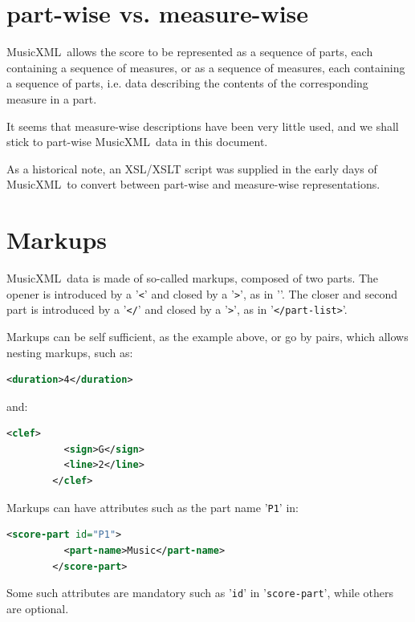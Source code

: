 \documentclass[12pt,a4paper]{article}
\newcommand{\mxml}{MusicXML}
\begin{document}
\section{part-wise vs. measure-wise}

\mxml\ allows the score to be represented as a sequence of parts, each containing a sequence of measures, or as a sequence of measures, each containing a sequence of parts, i.e. data describing the contents of the corresponding measure in a part.
 
It seems that measure-wise descriptions have been very little used, and we shall stick to part-wise \mxml\ data in this document.

As a historical note, an XSL/XSLT script was supplied in the early days of \mxml\ to convert between part-wise and measure-wise representations.

\section{Markups}

\mxml\ data is made of so-called markups, composed of two parts. The opener is introduced by a '{\tt <}' and closed by a '{\tt >}', as in '{\tt <part-list>}'. The closer and second part is introduced by a '{\tt </}' and closed by a '{\tt >}', as in '{\tt </part-list>}'.

Markups can be self sufficient, as the example above, or go by pairs, which allows nesting markups, such as:
\begin{lstlisting}[language=XML]
        <duration>4</duration>
\end{lstlisting}
and:
\begin{lstlisting}[language=XML]
        <clef>
          <sign>G</sign>
          <line>2</line>
        </clef>
\end{lstlisting}

Markups can have attributes such as the part name '{\tt P1}' in:
\begin{lstlisting}[language=XML]
        <score-part id="P1">
          <part-name>Music</part-name>
        </score-part>
\end{lstlisting}
Some such attributes are mandatory such as {'\tt id}' in {'\tt score-part}', while others are optional.
\end{document}
